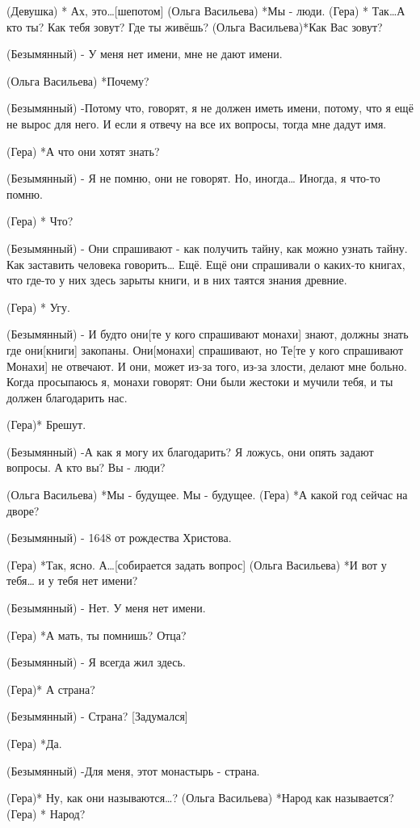 (Девушка) * Ах, это…[шепотом]
(Ольга Васильева) *Мы - люди.
(Гера) * Так…А кто ты? Как тебя зовут? Где ты живёшь?
(Ольга Васильева)*Как Вас зовут?

(Безымянный) - У меня нет имени, мне не дают имени.

(Ольга Васильева) *Почему?

(Безымянный) -Потому что, говорят,  я не должен иметь имени, потому, что я ещё не вырос для него. И если я отвечу на все их вопросы, тогда мне дадут имя.

(Гера) *А что они хотят знать?

(Безымянный) - Я не помню, они не говорят. Но, иногда… Иногда, я что-то помню.  

(Гера) * Что?

(Безымянный) - Они спрашивают - как получить тайну, как можно узнать тайну. Как заставить человека говорить… Ещё. Ещё  они спрашивали о каких-то книгах, что где-то у них здесь зарыты книги, и в них таятся знания древние. 

(Гера) * Угу.

(Безымянный) - И будто они[те у кого спрашивают монахи] знают, должны знать где они[книги] закопаны.  Они[монахи] спрашивают, но Те[те у кого спрашивают Монахи] не отвечают. И они, может из-за того, из-за злости, делают мне больно. Когда просыпаюсь я, монахи говорят: Они были жестоки и мучили тебя, и ты должен благодарить нас. 

(Гера)* Брешут.

(Безымянный) -А как я могу их благодарить? Я ложусь, они опять задают вопросы. А кто вы? Вы - люди?

(Ольга Васильева) *Мы - будущее. Мы - будущее.
(Гера) *А какой год сейчас на дворе?

(Безымянный) - 1648 от рождества Христова.

(Гера) *Так, ясно. А…[собирается задать вопрос]
(Ольга Васильева) *И вот у тебя… и у тебя нет имени?

(Безымянный) - Нет. У меня нет имени.

(Гера) *А мать, ты помнишь? Отца?

(Безымянный) - Я всегда жил здесь.

(Гера)* А страна? 

(Безымянный) - Страна? [Задумался]

(Гера) *Да.

(Безымянный) -Для меня, этот монастырь - страна.

(Гера)* Ну, как они называются…?
(Ольга Васильева) *Народ как называется? 
(Гера) * Народ? 

